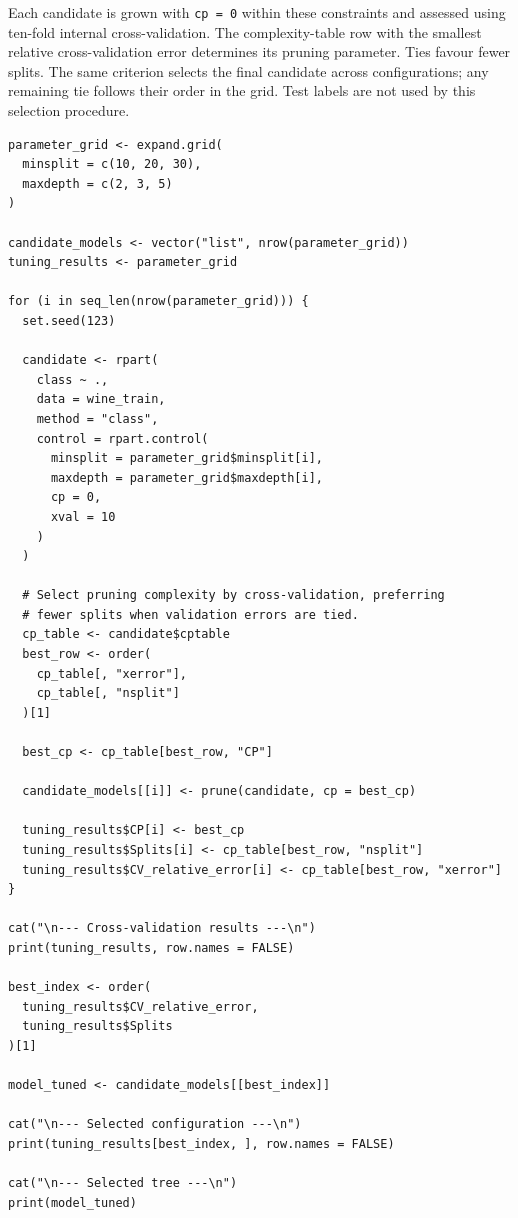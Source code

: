 \documentclass[11pt,a4paper]{article}
\begin{document}
Each candidate is grown with \texttt{cp = 0} within these constraints and assessed using ten-fold internal cross-validation. The complexity-table row with the smallest relative cross-validation error determines its pruning parameter. Ties favour fewer splits. The same criterion selects the final candidate across configurations; any remaining tie follows their order in the grid. Test labels are not used by this selection procedure.
\begin{lstlisting}
parameter_grid <- expand.grid(
  minsplit = c(10, 20, 30),
  maxdepth = c(2, 3, 5)
)

candidate_models <- vector("list", nrow(parameter_grid))
tuning_results <- parameter_grid

for (i in seq_len(nrow(parameter_grid))) {
  set.seed(123)

  candidate <- rpart(
    class ~ .,
    data = wine_train,
    method = "class",
    control = rpart.control(
      minsplit = parameter_grid$minsplit[i],
      maxdepth = parameter_grid$maxdepth[i],
      cp = 0,
      xval = 10
    )
  )

  # Select pruning complexity by cross-validation, preferring
  # fewer splits when validation errors are tied.
  cp_table <- candidate$cptable
  best_row <- order(
    cp_table[, "xerror"],
    cp_table[, "nsplit"]
  )[1]

  best_cp <- cp_table[best_row, "CP"]

  candidate_models[[i]] <- prune(candidate, cp = best_cp)

  tuning_results$CP[i] <- best_cp
  tuning_results$Splits[i] <- cp_table[best_row, "nsplit"]
  tuning_results$CV_relative_error[i] <- cp_table[best_row, "xerror"]
}

cat("\n--- Cross-validation results ---\n")
print(tuning_results, row.names = FALSE)

best_index <- order(
  tuning_results$CV_relative_error,
  tuning_results$Splits
)[1]

model_tuned <- candidate_models[[best_index]]

cat("\n--- Selected configuration ---\n")
print(tuning_results[best_index, ], row.names = FALSE)

cat("\n--- Selected tree ---\n")
print(model_tuned)
\end{lstlisting}
\end{document}
